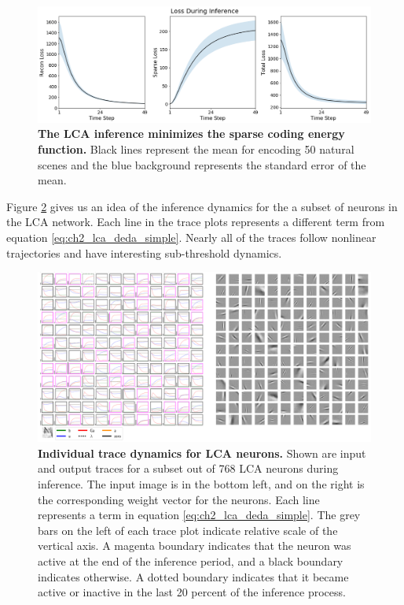 \begin{figure}[h]
    \centering
    \includegraphics[width=\textwidth]{figures/lca_inference_loss.png}
    \caption{\textbf{The LCA inference minimizes the sparse coding energy function.} Black lines represent the mean for encoding 50 natural scenes and the blue background represents the standard error of the mean.}
    \label{fig:ch2_lca_inference_loss}
\end{figure}

Figure \ref{fig:ch2_lca_inference_traces} gives us an idea of the inference dynamics for the a subset of neurons in the LCA network. Each line in the trace plots represents a different term from equation \eqref{eq:ch2_lca_deda_simple}. Nearly all of the traces follow nonlinear trajectories and have interesting sub-threshold dynamics.

\begin{figure}[h]
    \centering
    \includegraphics[width=\textwidth]{figures/lca_inference_traces.png}
    \caption{\textbf{Individual trace dynamics for LCA neurons.} Shown are input and output traces for a subset out of 768 LCA neurons during inference. The input image is in the bottom left, and on the right is the corresponding weight vector for the neurons. Each line represents a term in equation \eqref{eq:ch2_lca_deda_simple}. The grey bars on the left of each trace plot indicate relative scale of the vertical axis. A magenta boundary indicates that the neuron was active at the end of the inference period, and a black boundary indicates otherwise. A dotted boundary indicates that it became active or inactive in the last 20 percent of the inference process.}
    \label{fig:ch2_lca_inference_traces}
\end{figure}


